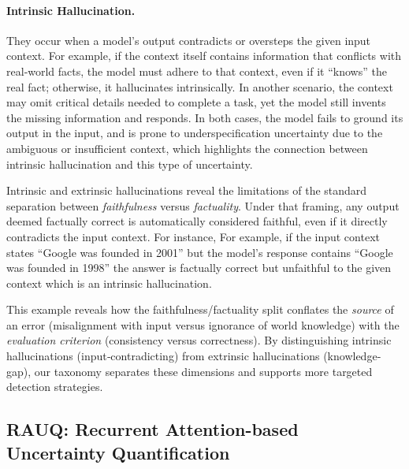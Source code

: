 \documentclass[letterpaper]{article} %
\begin{document}
\paragraph{Intrinsic Hallucination.}They occur when a model’s output contradicts or oversteps the given input context. For example, if the context itself contains information that conflicts with real‑world facts, the model must adhere to that context, even if it “knows” the real fact; otherwise, it hallucinates intrinsically. In another scenario, the context may omit critical details needed to complete a task, yet the model still invents the missing information and responds. In both cases, the model fails to ground its output in the input, %
and is prone to underspecification uncertainty due to the ambiguous or insufficient context, which highlights the connection between intrinsic hallucination and this type of uncertainty.

Intrinsic and extrinsic hallucinations reveal the limitations of the standard separation between \emph{faithfulness} versus \emph{factuality}. Under that framing, any output deemed factually correct is automatically considered faithful, even if it directly contradicts the input context. For instance, 
For example, if the input context states “Google was founded in 2001” but the model's response contains “Google was founded in 1998” the answer is factually correct but unfaithful to the given context which is an intrinsic hallucination.
 
This example reveals how the faithfulness/factuality split conflates the \emph{source} of an error (misalignment with input versus ignorance of world knowledge) with the \emph{evaluation criterion} (consistency versus correctness). By distinguishing intrinsic hallucinations (input‐contradicting) from extrinsic hallucinations (knowledge‐gap), our taxonomy separates these dimensions and supports more targeted detection strategies.


\subsection{RAUQ: Recurrent Attention-based Uncertainty Quantification}
\end{document}
